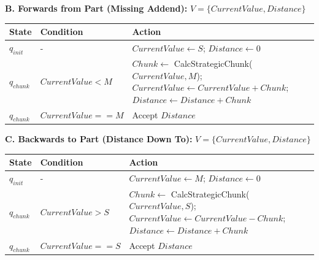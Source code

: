 \documentclass[12pt]{book}
\begin{document}
\textbf{B. Forwards from Part (Missing Addend):}
\(V = \{CurrentValue, Distance\}\)

\begin{longtable}[]{@{}
  >{\raggedright\arraybackslash}p{}
  >{\raggedright\arraybackslash}p{}
  >{\raggedright\arraybackslash}p{}@{}}
\toprule\noalign{}
\begin{minipage}[b]{\linewidth}\raggedright
State
\end{minipage} & \begin{minipage}[b]{\linewidth}\raggedright
Condition
\end{minipage} & \begin{minipage}[b]{\linewidth}\raggedright
Action
\end{minipage} \\
\midrule\noalign{}
\endhead
\bottomrule\noalign{}
\endlastfoot
\(q_{init}\) & - & \(CurrentValue \leftarrow S\);
\(Distance \leftarrow 0\) \\
\(q_{chunk}\) & \(CurrentValue < M\) & \(Chunk \leftarrow\)
CalcStrategicChunk(\(CurrentValue, M\));
\(CurrentValue \leftarrow CurrentValue + Chunk\);
\(Distance \leftarrow Distance + Chunk\) \\
\(q_{chunk}\) & \(CurrentValue == M\) & Accept \(Distance\) \\
\end{longtable}

\textbf{C. Backwards to Part (Distance Down To):}
\(V = \{CurrentValue, Distance\}\)

\begin{longtable}[]{@{}
  >{\raggedright\arraybackslash}p{}
  >{\raggedright\arraybackslash}p{}
  >{\raggedright\arraybackslash}p{}@{}}
\toprule\noalign{}
\begin{minipage}[b]{\linewidth}\raggedright
State
\end{minipage} & \begin{minipage}[b]{\linewidth}\raggedright
Condition
\end{minipage} & \begin{minipage}[b]{\linewidth}\raggedright
Action
\end{minipage} \\
\midrule\noalign{}
\endhead
\bottomrule\noalign{}
\endlastfoot
\(q_{init}\) & - & \(CurrentValue \leftarrow M\);
\(Distance \leftarrow 0\) \\
\(q_{chunk}\) & \(CurrentValue > S\) & \(Chunk \leftarrow\)
CalcStrategicChunk(\(CurrentValue, S\));
\(CurrentValue \leftarrow CurrentValue - Chunk\);
\(Distance \leftarrow Distance + Chunk\) \\
\(q_{chunk}\) & \(CurrentValue == S\) & Accept \(Distance\) \\
\end{longtable}
\end{document}
